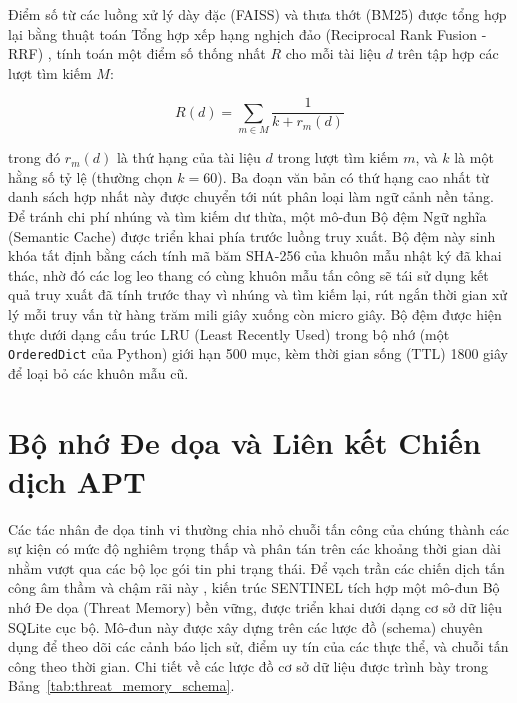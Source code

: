 Điểm số từ các luồng xử lý dày đặc (FAISS) và thưa thớt (BM25) được tổng hợp lại bằng thuật toán Tổng hợp xếp hạng nghịch đảo (Reciprocal Rank Fusion - RRF) \cite{rrf2009}, tính toán một điểm số thống nhất $R$ cho mỗi tài liệu $d$ trên tập hợp các lượt tìm kiếm $M$:

\begin{equation}
    R(d) = \sum_{m \in M} \frac{1}{k + r_m(d)}
\end{equation}

trong đó $r_m(d)$ là thứ hạng của tài liệu $d$ trong lượt tìm kiếm $m$, và $k$ là một hằng số tỷ lệ (thường chọn $k=60$). Ba đoạn văn bản có thứ hạng cao nhất từ danh sách hợp nhất này được chuyển tới nút phân loại làm ngữ cảnh nền tảng. Để tránh chi phí nhúng và tìm kiếm dư thừa, một mô-đun Bộ đệm Ngữ nghĩa (Semantic Cache) được triển khai phía trước luồng truy xuất. Bộ đệm này sinh khóa tất định bằng cách tính mã băm SHA-256 của khuôn mẫu nhật ký đã khai thác, nhờ đó các log leo thang có cùng khuôn mẫu tấn công sẽ tái sử dụng kết quả truy xuất đã tính trước thay vì nhúng và tìm kiếm lại, rút ngắn thời gian xử lý mỗi truy vấn từ hàng trăm mili giây xuống còn micro giây. Bộ đệm được hiện thực dưới dạng cấu trúc LRU (Least Recently Used) trong bộ nhớ (một \texttt{OrderedDict} của Python) giới hạn 500 mục, kèm thời gian sống (TTL) 1800 giây để loại bỏ các khuôn mẫu cũ.

\section{Bộ nhớ Đe dọa và Liên kết Chiến dịch APT}

Các tác nhân đe dọa tinh vi thường chia nhỏ chuỗi tấn công của chúng thành các sự kiện có mức độ nghiêm trọng thấp và phân tán trên các khoảng thời gian dài nhằm vượt qua các bộ lọc gói tin phi trạng thái. Để vạch trần các chiến dịch tấn công âm thầm và chậm rãi này \cite{apt_stealth2021}, kiến trúc SENTINEL tích hợp một mô-đun Bộ nhớ Đe dọa (Threat Memory) bền vững, được triển khai dưới dạng cơ sở dữ liệu SQLite cục bộ. Mô-đun này được xây dựng trên các lược đồ (schema) chuyên dụng để theo dõi các cảnh báo lịch sử, điểm uy tín của các thực thể, và chuỗi tấn công theo thời gian. Chi tiết về các lược đồ cơ sở dữ liệu được trình bày trong Bảng~\ref{tab:threat_memory_schema}.

